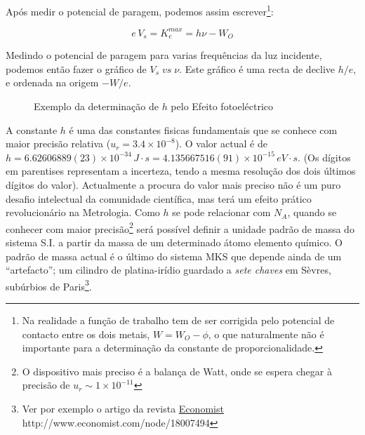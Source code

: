 \documentclass[a4paper,12pt]{article}  %
\begin{document}
 Após medir o potencial de paragem, podemos assim escrever\footnote{Na realidade a função de trabalho tem de ser corrigida pelo potencial de contacto entre os dois metais, $W=W_O - \phi$, o que naturalmente não é importante para a determinação da constante de proporcionalidade.}:

\begin{equation}
	\label{eq:energia}
	e\,V_s= K_e^{max}= h \nu - W_O
\end{equation}

Medindo o potencial de paragem para varias frequências da luz incidente, podemos então fazer o gráfico de $V_s\; vs \;\nu$. Este gráfico é uma recta de declive $h/e$, e ordenada na origem  $-W/e$.


\begin{figure}[htb]   
\begin{center}
  \sansmath

	\caption{Exemplo da determinação de $h$ pelo Efeito fotoeléctrico}
	 \label{fig:hplot} 
	\end{center}
\end{figure}

A constante $h$ é uma das constantes fisicas fundamentais que se conhece com maior precisão relativa ($u_r = 3.4\times 10^{-8}$). O valor actual é de $h=6.62606889(23) \times 10^{-34}\,J\cdot s=4.135667516(91)\times 10^{-15}\,eV\cdot s$. (Os  dígitos em parentises representam a incerteza, tendo a mesma resolução dos dois últimos dígitos do valor). Actualmente a procura do valor mais preciso não é um puro desafio intelectual da comunidade científica, mas terá um efeito prático revolucionário na Metrologia. Como $h$ se pode relacionar com $N_A$, quando se conhecer com maior precisão\footnote{O dispositivo mais preciso é a balança de Watt, onde se espera chegar à precisão de $u_r \sim 1\times 10^{-11}$} será possível definir a unidade padrão de massa do sistema S.I. a partir da massa de um determinado átomo elemento químico. O padrão de massa actual é o último do sistema MKS que depende ainda de um ``artefacto''; um cilindro de platina-irídio guardado a \emph{sete chaves} em Sèvres, subúrbios de Paris\footnote{Ver por exemplo o artigo da revista \href{http://www.economist.com/node/18007494}{Economist} http://www.economist.com/node/18007494}.   
 
\end{document}
